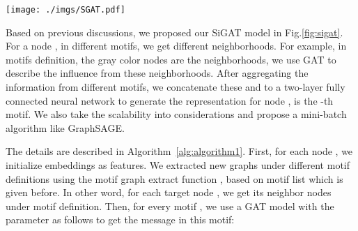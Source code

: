 \documentclass[runningheads]{llncs}
\begin{document}
\begin{figure*}[!ht]
    \centering
    \texttt{[image: ./imgs/SGAT.pdf]}
    \caption{For a signed network, the target  is the orange node. Red/Green links mean positive/negative links, the arrows indicate the directions.
    We define different motifs and obtain the corresponding neighborhoods in them. Under a motif definition, the gray color nodes are the neighborhoods, we use GAT to describe the influences from these neighborhoods. After aggregating the information from different motifs, we use these  and  to get the representation .  }
    \label{fig:sigat}

\end{figure*}

Based on previous discussions, we proposed our SiGAT model in Fig.\ref{fig:sigat}. For a node , in different motifs, we get different neighborhoods. For example, in  motifs definition, the gray color nodes  are the neighborhoods, we use GAT to describe the influence from these neighborhoods. After aggregating the information from different motifs, we concatenate these  and  to a two-layer fully connected neural network to generate the representation  for node ,  is the -th motif.
We also take the scalability into considerations and propose a mini-batch algorithm like GraphSAGE\cite{hamilton2017inductive}. 

The details are described in Algorithm~\ref{alg:algorithm1}. 
First, for each node , we initialize embeddings  as features. 
We extracted new graphs under different motif definitions using the motif graph extract function , based on motif list which is given before.  
In other word, for each target node , we get its neighbor nodes  under motif  definition. 
Then, for every motif , we use a GAT model  with the parameter  as follows to get the message  in this motif:
\end{document}
